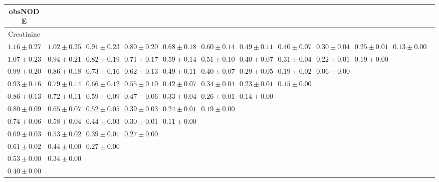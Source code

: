 \begin{table}[ht]
\centering
{\tiny
{
\begin{adjustbox}{width=\textwidth}
\begin{tabular}{cccccccccccc}
\hline
obsNODE &  &  &  &  &  &  &  &  &  & \\
\hline
Creatinine &  &  &  &  &  &  &  &  &  & \\
\hline
$1.16 \pm 0.27$ & $1.02 \pm 0.25$ & $0.91 \pm 0.23$ & $0.80 \pm 0.20$ & $0.68 \pm 0.18$ & $0.60 \pm 0.14$ & $0.49 \pm 0.11$ & $0.40 \pm 0.07$ & $0.30 \pm 0.04$ & $0.25 \pm 0.01$ & $0.13 \pm 0.00$ &  \\
$1.07 \pm 0.23$ & $0.94 \pm 0.21$ & $0.82 \pm 0.19$ & $0.71 \pm 0.17$ & $0.59 \pm 0.14$ & $0.51 \pm 0.10$ & $0.40 \pm 0.07$ & $0.31 \pm 0.04$ & $0.22 \pm 0.01$ & $0.19 \pm 0.00$ &  &  \\
$0.99 \pm 0.20$ & $0.86 \pm 0.18$ & $0.73 \pm 0.16$ & $0.62 \pm 0.13$ & $0.49 \pm 0.11$ & $0.40 \pm 0.07$ & $0.29 \pm 0.05$ & $0.19 \pm 0.02$ & $0.06 \pm 0.00$ &  &  &  \\
$0.93 \pm 0.16$ & $0.79 \pm 0.14$ & $0.66 \pm 0.12$ & $0.55 \pm 0.10$ & $0.42 \pm 0.07$ & $0.34 \pm 0.04$ & $0.23 \pm 0.01$ & $0.15 \pm 0.00$ &  &  &  &  \\
$0.86 \pm 0.13$ & $0.72 \pm 0.11$ & $0.59 \pm 0.09$ & $0.47 \pm 0.06$ & $0.33 \pm 0.04$ & $0.26 \pm 0.01$ & $0.14 \pm 0.00$ &  &  &  &  &  \\
$0.80 \pm 0.09$ & $0.65 \pm 0.07$ & $0.52 \pm 0.05$ & $0.39 \pm 0.03$ & $0.24 \pm 0.01$ & $0.19 \pm 0.00$ &  &  &  &  &  &  \\
$0.74 \pm 0.06$ & $0.58 \pm 0.04$ & $0.44 \pm 0.03$ & $0.30 \pm 0.01$ & $0.11 \pm 0.00$ &  &  &  &  &  &  &  \\
$0.69 \pm 0.03$ & $0.53 \pm 0.02$ & $0.39 \pm 0.01$ & $0.27 \pm 0.00$ &  &  &  &  &  &  &  &  \\
$0.61 \pm 0.02$ & $0.44 \pm 0.00$ & $0.27 \pm 0.00$ &  &  &  &  &  &  &  &  &  \\
$0.53 \pm 0.00$ & $0.34 \pm 0.00$ &  &  &  &  &  &  &  &  &  &  \\
$0.40 \pm 0.00$ &  &  &  &  &  &  &  &  &  &  &  \\



\end{tabular}
\end{adjustbox}}}
\end{table}
